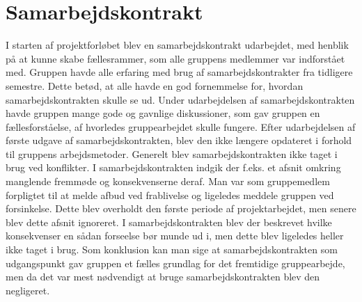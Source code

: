 \section{Samarbejdskontrakt}
I starten af projektforløbet blev en samarbejdskontrakt udarbejdet, med henblik på at kunne skabe fællesrammer, som alle gruppens medlemmer var indforstået med. Gruppen havde alle erfaring med brug af samarbejdskontrakter fra tidligere semestre. Dette betød, at alle havde en god fornemmelse for, hvordan samarbejdskontrakten skulle se ud. Under udarbejdelsen af samarbejdskontrakten havde gruppen mange gode og gavnlige diskussioner, som gav gruppen en fællesforståelse, af hvorledes gruppearbejdet skulle fungere. 
Efter udarbejdelsen af første udgave af samarbejdskontrakten, blev den ikke længere opdateret i forhold til gruppens arbejdsmetoder. Generelt blev samarbejdskontrakten ikke taget i brug ved konflikter. I samarbejdskontrakten indgik der f.eks. et afsnit omkring manglende fremmøde og konsekvenserne deraf. Man var som gruppemedlem forpligtet til at melde afbud ved frablivelse og ligeledes meddele gruppen ved forsinkelse. Dette blev overholdt den første periode af projektarbejdet, men senere blev dette afsnit ignoreret. I samarbejdskontrakten blev der beskrevet hvilke konsekvenser en sådan forseelse bør munde ud i, men dette blev ligeledes heller ikke taget i brug. 
Som konklusion kan man sige at samarbejdskontrakten som udgangspunkt gav gruppen et fælles grundlag for det fremtidige gruppearbejde, men da det var mest nødvendigt at bruge samarbejdskontrakten blev den negligeret.
